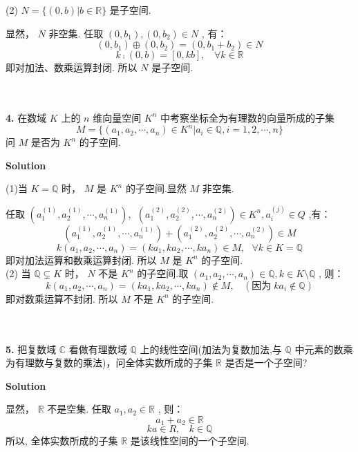 \documentclass[11pt,a4paper,openany,oneside]{book}
\newcommand\Solution{\noindent\textbf{\textsf{Solution}}\par\medskip}
\begin{document}
(2)  $ N = \{(0, b)| b \in \mathbb{R} \} $ 是子空间.

显然， $ N $ 非空集. 任取 $ (0, b_1), (0, b_2) \in N $ , 有：
 $$  (0, b_1) \oplus  (0, b_2) = (0, b_1 + b_2) \in N  $$ 
 $$  k \comp (0, b) = \left[ 0, kb \right], \ \ \ \ \forall k \in \mathbb{R}  $$  即对加法、数乘运算封闭. 所以 $ N $ 是子空间. \\  \\  \\

\begin{myexample}
	\textbf{4.} 
在数域 $ K $ 上的 $ n $ 维向量空间 $ K^n $ 中考察坐标全为有理数的向量所成的子集
 $$  M = \{(a_1, a_2, \cdots, a_n) \in K^n | a_i \in \mathbb{Q}, i = 1, 2, \cdots, n  \}  $$ 
问 $ M $ 是否为 $ K^n $ 的子空间.  \\  

\end{myexample}
\Solution 

(1)当 $ K = \mathbb{Q}  $ 时， $ M $ 是 $ K^n $ 的子空间.显然 $ M $ 非空集.

任取 $ (a_1^{(1)}, a_2^{(1)}, \cdots, a_n^{(1)}),\ \  (a_1^{(2)}, a_2^{(2)}, \cdots, a_n^{(2)}) \in K^n, a_i^{(j)} \in Q  $ ,有：
 $$  (a_1^{(1)}, a_2^{(1)}, \cdots, a_n^{(1)}) + (a_1^{(2)}, a_2^{(2)}, \cdots, a_n^{(2)}) \in M  $$ 
 $$  k(a_1, a_2, \cdots, a_n) =  (ka_1, ka_2, \cdots, ka_n)\in M, \ \ \ \forall k \in K = \mathbb{Q}  $$ 
即对加法运算和数乘运算封闭. 所以 $ M $ 是 $ K^n $ 的子空间.  \\ 

(2) 当 $ \mathbb{Q} \subsetneq K $ 时， $ N $ 不是 $ K^n $ 的子空间.取 $ (a_1, a_2, \cdots, a_n) \in \mathbb{Q}, k \in K \setminus \mathbb{Q} $ , 则：
 $$  k(a_1, a_2, \cdots, a_n) = (ka_1, ka_2, \cdots, ka_n) \notin M, \ \ \ \ (\text{因为} \;ka_i \notin \mathbb{Q})  $$ 
即对数乘运算不封闭. 所以 $ M $ 不是 $ K^n $ 的子空间.  \\  \\  \\


\begin{myexample}
	\textbf{5.} 
把复数域 $ \mathbb{C} $ 看做有理数域 $ \mathbb{Q} $ 上的线性空间(加法为复数加法,与 $ \mathbb{Q} $ 中元素的数乘为有理数与复数的乘法)，问全体实数所成的子集 $ \mathbb{R} $ 是否是一个子空间?  \\  

\end{myexample}
\Solution 

显然， $ \mathbb{R} $ 不是空集. 任取 $ a_1, a_2 \in \mathbb{R} $ , 则：
 $$  a_1 + a_2 \in \mathbb{R}  $$ 
 $$  ka \in R, \ \ \ \ k \in \mathbb{Q}  $$ 
所以, 全体实数所成的子集 $ \mathbb{R} $ 是该线性空间的一个子空间.   \\  \\   \\ 
\end{document}
